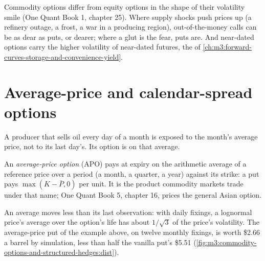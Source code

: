 Commodity options differ from equity options in the shape of their volatility smile (One Quant Book 1,
chapter 25). Where supply shocks push prices up (a refinery outage, a frost, a war in a producing
region), out-of-the-money calls can be as dear as puts, or dearer; where a glut is the fear, puts are.
And near-dated options carry the higher volatility of near-dated futures, the  of
\cref{ch:m3:forward-curves-storage-and-convenience-yield}.

\section{Average-price and calendar-spread options}

A producer that sells oil every day of a month is exposed to the month's average price, not to its last
day's. Its option is on that average.

\begin{definition}\label{def:m3:commodity-options-and-structured-hedges:apo}
An \emph{average-price option} (APO) pays at expiry on the arithmetic
average of a reference price over a period (a month, a quarter, a year) against its strike: a put
pays $\max(K - \bar P, 0)$ per unit. It is the product commodity markets trade under that name; One
Quant Book 5, chapter 16, prices the general Asian option.
\end{definition}

An average moves less than its last observation: with daily fixings, a lognormal price's average over
the option's life has about $1/\sqrt 3$ of the price's volatility. The average-price put of the example
above, on twelve monthly fixings, is worth \$2.66 a barrel by simulation, less than half the vanilla put's
\$5.51 (\cref{fig:m3:commodity-options-and-structured-hedges:dist}).

